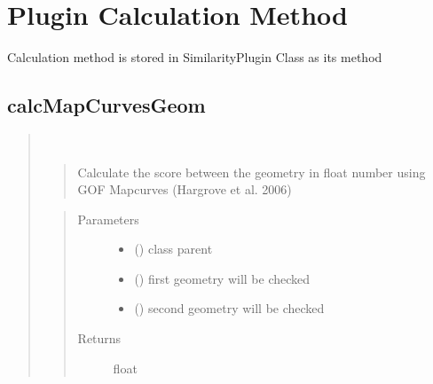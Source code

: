 \documentclass[letterpaper,10pt,english]{sphinxmanual}
\begin{document}
\chapter{Plugin Calculation Method}
\label{\detokenize{similarity_method:plugin-calculation-method}}\label{\detokenize{similarity_method::doc}}
Calculation method is stored in SimilarityPlugin Class as its method


\section{calcMapCurvesGeom}
\label{\detokenize{similarity_method:calcmapcurvesgeom}}\begin{quote}

\begin{fulllineitems}
\label{\detokenize{similarity_method:calcMapCurvesGeom}}~\begin{quote}

Calculate the score between the geometry in float number using GOF Mapcurves (Hargrove et al. 2006)
\end{quote}
\begin{quote}\begin{description}
\item[{Parameters}] \leavevmode\begin{itemize}
\item {} 
 () \textendash{} class parent

\item {} 
 () \textendash{} first geometry will be checked

\item {} 
 () \textendash{} second geometry will be checked

\end{itemize}

\item[{Returns}] \leavevmode
float

\end{description}\end{quote}

\end{fulllineitems}

\end{quote}
\end{document}
